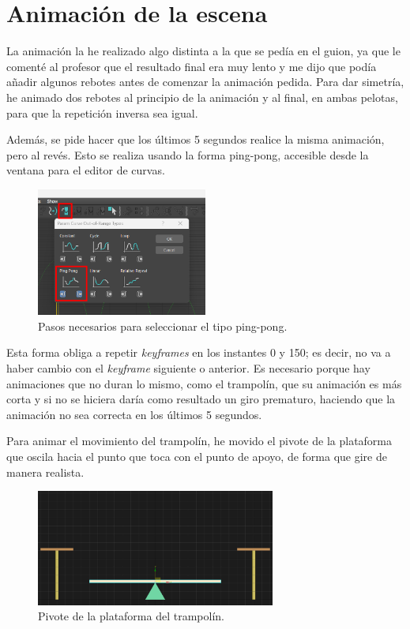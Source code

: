 \section{Animación de la escena}

La animación la he realizado algo distinta a la que se pedía en el guion, ya que le comenté al profesor que el resultado final era muy lento y me dijo que podía añadir algunos rebotes antes de comenzar la animación pedida. Para dar simetría, he animado dos rebotes al principio de la animación y al final, en ambas pelotas, para que la repetición inversa sea igual.

\bigskip

Además, se pide hacer que los últimos 5 segundos realice la misma animación, pero al revés. Esto se realiza usando la forma ping-pong, accesible desde la ventana para el editor de curvas.

\begin{figure}[H]
    \centering
    \includegraphics[width=0.5\textwidth]{imagenes/misc/ping-pong.png}
    \caption{Pasos necesarios para seleccionar el tipo ping-pong.}
\end{figure}

Esta forma obliga a repetir \textit{keyframes} en los instantes 0 y 150; es decir, no va a haber cambio con el \textit{keyframe} siguiente o anterior. Es necesario porque hay animaciones que no duran lo mismo, como el trampolín, que su animación es más corta y si no se hiciera daría como resultado un giro prematuro, haciendo que la animación no sea correcta en los últimos 5 segundos.

\bigskip

Para animar el movimiento del trampolín, he movido el pivote de la plataforma que oscila hacia el punto que toca con el punto de apoyo, de forma que gire de manera realista.

\begin{figure}[H]
    \centering
    \includegraphics[width=0.7\textwidth]{imagenes/misc/PivotTrampolin.png}
    \caption{Pivote de la plataforma del trampolín.}
\end{figure}


